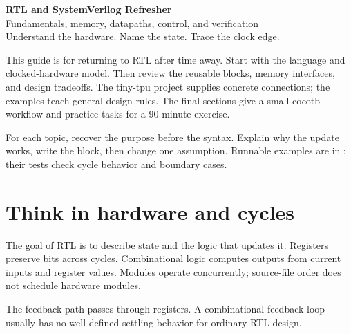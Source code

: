 \documentclass[11pt]{article}
\newcommand{\cd}[1]{{\frenchspacing\texttt{\detokenize{#1}}}}
\begin{document}
\begin{center}
{\LARGE\bfseries RTL and SystemVerilog Refresher}\\[5pt]
{\large Fundamentals, memory, datapaths, control, and verification}\\[4pt]
{\small Understand the hardware. Name the state. Trace the clock edge.}
\end{center}
This guide is for returning to RTL after time away. Start with the language and clocked-hardware model.
Then review the reusable blocks, memory interfaces, and design tradeoffs.
The tiny-tpu project supplies concrete connections; the examples teach general design rules.
The final sections give a small cocotb workflow and practice tasks for a 90-minute exercise.

For each topic, recover the purpose before the syntax. Explain why the update works, write the block, then change one assumption.
Runnable examples are in \cd{examples/}; their tests check cycle behavior and boundary cases.
\tableofcontents
\newpage

\section{Think in hardware and cycles}\label{sec:model}
The goal of RTL is to describe state and the logic that updates it.
Registers preserve bits across cycles. Combinational logic computes outputs from current inputs and register values.
Modules operate concurrently; source-file order does not schedule hardware modules.

\begin{center}
\end{center}
The feedback path passes through registers. A combinational feedback loop usually has no well-defined settling behavior for ordinary RTL design.
\end{document}
